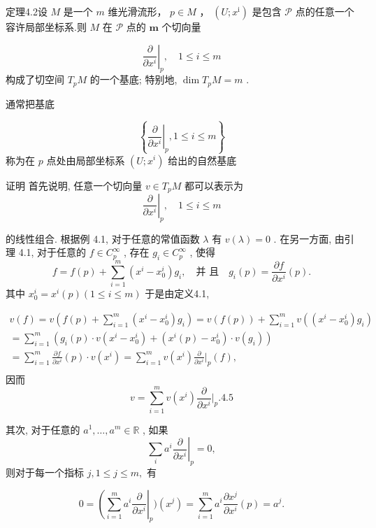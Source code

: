 定理4.2设  $M$  是一个  $m$  维光滑流形，  $p\in M$  ，  $(U;x^{\mathrm{i}})$  是包含  $\mathcal{P}$  点的任意一个容许局部坐标系.则  $M$  在  $\mathcal{P}$  点的  $\pmb{m}$  个切向量

$$
\left. \frac {\partial}{\partial x ^ {i}} \right| _ {p}, \quad 1 \leqslant i \leqslant m
$$
构成了切空间  $T_{p}M$  的一个基底; 特别地,  $\dim T_{p}M = m$ .

通常把基底

$$
\left\{\left. \frac {\partial}{\partial x ^ {i}} \right| _ {p}, 1 \leqslant i \leqslant m \right\}
$$
称为在  $p$  点处由局部坐标系  $(U; x^i)$  给出的自然基底

证明 首先说明, 任意一个切向量  $v \in T_pM$  都可以表示为
$$
\left. \frac {\partial}{\partial x ^ {i}} \right| _ {p}, \quad 1 \leqslant i \leqslant m
$$

的线性组合. 根据例 4.1, 对于任意的常值函数  $\lambda$  有  $v(\lambda) = 0$ . 在另一方面, 由引理 4.1, 对于任意的  $f \in C_{p}^{\infty}$ , 存在  $g_{i} \in C_{p}^{\infty}$ , 使得
$$
f = f (p) + \sum_ {i = 1} ^ {m} (x ^ {i} - x _ {0} ^ {i}) g _ {i}, \quad \text {并 且} \quad g _ {i} (p) = {\frac {\partial f}{\partial x ^ {i}}} (p).
$$
其中  $x_0^i = x^i (p)(1\leqslant i\leqslant m)$  于是由定义4.1,

$$
\begin{array}{l} v (f) = v \left(f (p) + \sum_ {i = 1} ^ {m} \left(x ^ {i} - x _ {0} ^ {i}\right) g _ {i}\right) = v (f (p)) + \sum_ {i = 1} ^ {m} v \left(\left(x ^ {i} - x _ {0} ^ {i}\right) g _ {i}\right) \\ = \sum_ {i = 1} ^ {m} \left(g _ {i} (p) \cdot v \left(x ^ {i} - x _ {0} ^ {i}\right) + \left(x ^ {i} (p) - x _ {0} ^ {i}\right) \cdot v \left(g _ {i}\right)\right) \\ = \sum_ {i = 1} ^ {m} \frac {\partial f}{\partial x ^ {i}} (p) \cdot v \left(x ^ {i}\right) = \sum_ {i = 1} ^ {m} v \left(x ^ {i}\right) \frac {\partial}{\partial x ^ {i}} \Bigg | _ {p} (f), \\ \end{array}
$$
因而
$$
v = \sum_ {i = 1} ^ {m} v \left(x ^ {i}\right) \frac {\partial}{\partial x ^ {i}} \Bigg | _ {p}. %
 {4.5}
$$

其次, 对于任意的  $a^1, \dots, a^m \in \mathbb{R}$ , 如果
$$
\sum_ {i} a ^ {i} \left. \frac {\partial}{\partial x ^ {i}} \right| _ {p} = 0,
$$
则对于每一个指标  $j, 1 \leqslant j \leqslant m,$  有

$$
0 = \left(\sum_ {i = 1} ^ {m} a ^ {i} \frac {\partial}{\partial x ^ {i}} \right| _ {p}) (x ^ {j}) = \sum_ {i = 1} ^ {m} a ^ {i} \frac {\partial x ^ {j}}{\partial x ^ {i}} (p) = a ^ {j}.
$$

